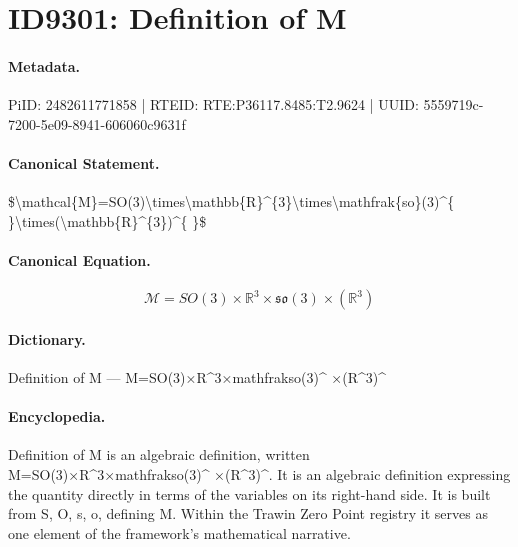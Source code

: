 \section*{ID9301: Definition of M}
\paragraph{Metadata.}
PiID: 2482611771858 | RTEID: RTE:P36117.8485:T2.9624 | UUID: 5559719c-7200-5e09-8941-606060c9631f

\paragraph{Canonical Statement.}
\$\textbackslash{}mathcal\{M\}=SO(3)\textbackslash{}times\textbackslash{}mathbb\{R\}\textasciicircum{}\{3\}\textbackslash{}times\textbackslash{}mathfrak\{so\}(3)\textasciicircum{}\{ \}\textbackslash{}times(\textbackslash{}mathbb\{R\}\textasciicircum{}\{3\})\textasciicircum{}\{ \}\$

\paragraph{Canonical Equation.}
\[
\mathcal{M}=SO(3)\times\mathbb{R}^{3}\times\mathfrak{so}(3)^{ }\times(\mathbb{R}^{3})^{ }
\]

\paragraph{Dictionary.}
Definition of M — M=SO(3)×R\textasciicircum{}3×mathfrakso(3)\textasciicircum{} ×(R\textasciicircum{}3)\textasciicircum{}

\paragraph{Encyclopedia.}
Definition of M is an algebraic definition, written M=SO(3)×R\textasciicircum{}3×mathfrakso(3)\textasciicircum{} ×(R\textasciicircum{}3)\textasciicircum{}. It is an algebraic definition expressing the quantity directly in terms of the variables on its right-hand side. It is built from S, O, s, o, defining M. Within the Trawin Zero Point registry it serves as one element of the framework's mathematical narrative.
